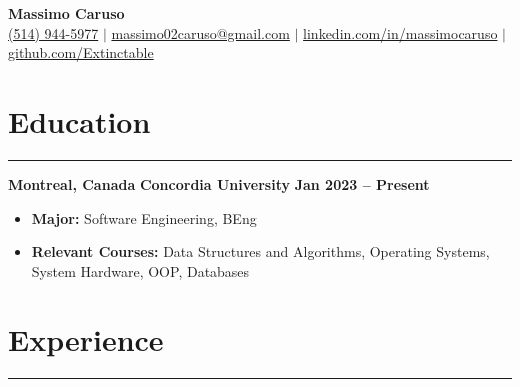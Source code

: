 \documentclass[10pt]{article}
\begin{document}
\newcommand{\fullname}{Massimo Caruso}
\newcommand{\phone}{(514) 944-5977}
\newcommand{\email}{massimo02caruso@gmail.com}
\newcommand{\linkedin}{linkedin.com/in/massimocaruso}
\newcommand{\github}{github.com/Extinctable}

\begin{center}
    {\Huge \textbf{\fullname}} \\
    \vspace{1mm}
    {\small 
    \faPhone \hspace{0mm} \href{tel:+15149445977}{\phone} $\vert$ 
    \faEnvelope \hspace{0mm} \href{mailto:massimo02caruso@gmail.com}{\email} $\vert$ 
    \faLinkedin \hspace{0mm} \href{https://linkedin.com/in/massimocaruso}{\linkedin} $\vert$ 
    \faGithub \hspace{0mm} \href{https://github.com/Extinctable}{\github}
    }
\end{center}

\vspace{-8mm}

\section*{Education}
\vspace{-2mm}
\hrule
\vspace{0mm}

\textbf{Montreal, Canada} \hfill \textbf{Concordia University} \hfill \textbf{Jan 2023 -- Present} 
\vspace{-4mm}
\begin{itemize}[left=0.15in, itemsep=0pt]
    \item \textbf{Major:} Software Engineering, BEng
    \item \textbf{Relevant Courses:} Data Structures and Algorithms, Operating Systems, System Hardware, OOP, Databases
\end{itemize}

\section*{Experience}
\vspace{-2mm}
\hrule
\vspace{0mm}
\end{document}
